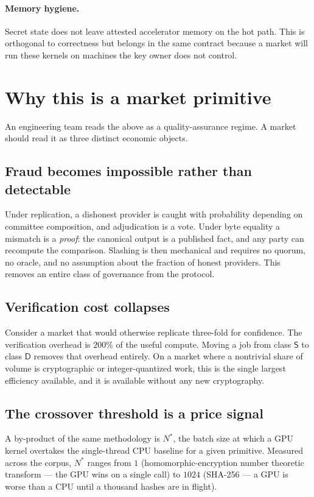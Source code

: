 \documentclass[11pt,a4paper]{article}
\begin{document}
\paragraph{Memory hygiene.} Secret state does not leave attested accelerator
memory on the hot path. This is orthogonal to correctness but belongs in the
same contract because a market will run these kernels on machines the key owner
does not control.

\section{Why this is a market primitive}

An engineering team reads the above as a quality-assurance regime. A market
should read it as three distinct economic objects.

\subsection{Fraud becomes impossible rather than detectable}

Under replication, a dishonest provider is caught with probability depending on
committee composition, and adjudication is a vote. Under byte equality a
mismatch is a \emph{proof}: the canonical output is a published fact, and any
party can recompute the comparison. Slashing is then mechanical and requires no
quorum, no oracle, and no assumption about the fraction of honest providers.
This removes an entire class of governance from the protocol.

\subsection{Verification cost collapses}

Consider a market that would otherwise replicate three-fold for confidence. The
verification overhead is $200\%$ of the useful compute. Moving a job from class
$\mathsf{S}$ to class $\mathsf{D}$ removes that overhead entirely. On a market
where a nontrivial share of volume is cryptographic or integer-quantized work,
this is the single largest efficiency available, and it is available without any
new cryptography.

\subsection{The crossover threshold is a price signal}

A by-product of the same methodology is $N^{*}$, the batch size at which a GPU
kernel overtakes the single-thread CPU baseline for a given primitive. Measured
across the corpus, $N^{*}$ ranges from $1$ (homomorphic-encryption number
theoretic transform --- the GPU wins on a single call) to $1024$ (SHA-256 --- a
GPU is worse than a CPU until a thousand hashes are in flight).
\end{document}
